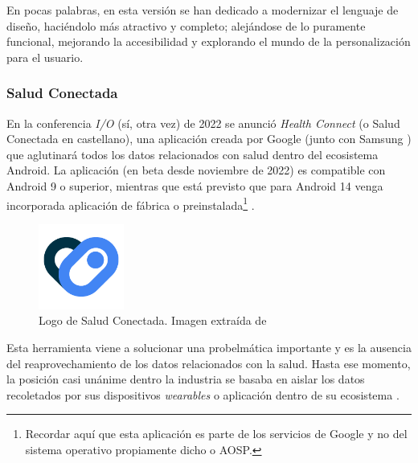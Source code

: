             En pocas palabras, en esta versión se han dedicado a modernizar el lenguaje de diseño, haciéndolo más 
            atractivo y completo; alejándose de lo puramente funcional, mejorando la accesibilidad y explorando 
            el mundo de la personalización para el usuario.

        \subsubsection{Salud Conectada}
            \label{section:salud_conectada}
            En la conferencia \textit{I/O} (sí, otra vez) de 2022 se anunció \textit{Health Connect} (o Salud Conectada
            en castellano), una aplicación creada por Google (junto con Samsung \cite{wilk_introducing_2022}) 
            que aglutinará todos los datos relacionados con salud dentro del ecosistema
            Android. La aplicación (en beta desde noviembre de 2022) es compatible con Android 9 o 
            superior, mientras que está previsto que para Android 14 venga
            incorporada aplicación de fábrica o preinstalada\footnote{Recordar aquí que esta aplicación es
            parte de los servicios de Google y no del sistema operativo propiamente dicho o AOSP.} 
            \cite{pandey_health_2023}. 

            \begin{figure}[h]
                \centering
                \includegraphics[width=0.25\textwidth]{figures/Health connect logo.png}
                \caption[Logo de Salud Conectada.]
                {Logo de Salud Conectada. Imagen extraída de \cite{noauthor_health_nodate}}
                \label{figure:health_connect:logo}
            \end{figure}

            Esta herramienta viene a solucionar una probelmática importante y es la ausencia del reaprovechamiento de 
            los datos relacionados con la salud. Hasta ese momento, la posición casi unánime dentro la 
            industria se basaba en aislar los datos recoletados por sus dispositivos \textit{wearables} o aplicación 
            dentro de su ecosistema \cite{ramirez_android_2022} \cite{rahman_android_2023}. 
            
